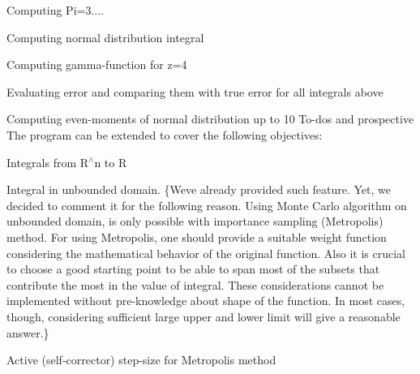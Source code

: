 \begin{DoxyEnumerate}
\item Computing Pi=3....
\item Computing normal distribution integral
\item Computing gamma-\/function for z=4
\item Evaluating error and comparing them with true error for all integrals above
\item Computing even-\/moments of normal distribution up to 10 To-\/dos and prospective The program can be extended to cover the following objectives\+:
\end{DoxyEnumerate}
\begin{DoxyEnumerate}
\item Integrals from R$^\wedge$n to R
\item Integral in unbounded domain. \{We\textquotesingle{}ve already provided such feature. Yet, we decided to comment it for the following reason. Using Monte Carlo algorithm on unbounded domain, is only possible with importance sampling (Metropolis) method. For using Metropolis, one should provide a suitable weight function considering the mathematical behavior of the original function. Also it is crucial to choose a good starting point to be able to span most of the subsets that contribute the most in the value of integral. These considerations cannot be implemented without pre-\/knowledge about shape of the function. In most cases, though, considering sufficient large upper and lower limit will give a reasonable answer.\}
\item Active (self-\/corrector) step-\/size for Metropolis method 
\end{DoxyEnumerate}